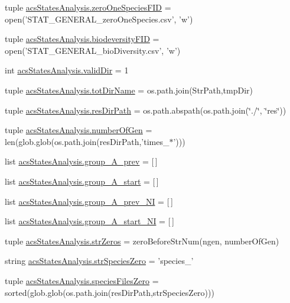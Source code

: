 \begin{DoxyCompactItemize}
\item 
tuple \hyperlink{a00098_a3dc90aca8a97c5995b013887c98d8ce9}{acs\-States\-Analysis.\-zero\-One\-Species\-F\-I\-D} = open('S\-T\-A\-T\-\_\-\-G\-E\-N\-E\-R\-A\-L\-\_\-zero\-One\-Species.\-csv', 'w')
\item 
tuple \hyperlink{a00098_a68c23cb79e89d9e14acf9ed09f46f0e4}{acs\-States\-Analysis.\-biodeversity\-F\-I\-D} = open('S\-T\-A\-T\-\_\-\-G\-E\-N\-E\-R\-A\-L\-\_\-bio\-Diversity.\-csv', 'w')
\item 
int \hyperlink{a00098_aebb18ab2b73e7e2705ee42c728c0a72b}{acs\-States\-Analysis.\-valid\-Dir} = 1
\item 
tuple \hyperlink{a00098_af4bd99f6cdaec32f48ed0074208b4f0c}{acs\-States\-Analysis.\-tot\-Dir\-Name} = os.\-path.\-join(Str\-Path,tmp\-Dir)
\item 
tuple \hyperlink{a00098_ab3da7da39258338965b6eef645a913ee}{acs\-States\-Analysis.\-res\-Dir\-Path} = os.\-path.\-abspath(os.\-path.\-join(\char`\"{}./\char`\"{}, \char`\"{}res\char`\"{}))
\item 
tuple \hyperlink{a00098_a54acb4eba0735e72c2a820383febd37f}{acs\-States\-Analysis.\-number\-Of\-Gen} = len(glob.\-glob(os.\-path.\-join(res\-Dir\-Path,'times\-\_\-$\ast$')))
\item 
list \hyperlink{a00098_a1dd2f2c85f697e454c99be1a157d6c17}{acs\-States\-Analysis.\-group\-\_\-\-A\-\_\-prev} = \mbox{[}$\,$\mbox{]}
\item 
list \hyperlink{a00098_a3898175300d001a17a60c23656d2812f}{acs\-States\-Analysis.\-group\-\_\-\-A\-\_\-start} = \mbox{[}$\,$\mbox{]}
\item 
list \hyperlink{a00098_a4d77133a6a303d9486944707f3310cf8}{acs\-States\-Analysis.\-group\-\_\-\-A\-\_\-prev\-\_\-\-N\-I} = \mbox{[}$\,$\mbox{]}
\item 
list \hyperlink{a00098_aedb746884c5ae6e301c8ad2d8307fe4d}{acs\-States\-Analysis.\-group\-\_\-\-A\-\_\-start\-\_\-\-N\-I} = \mbox{[}$\,$\mbox{]}
\item 
tuple \hyperlink{a00098_a292c23aa303304f24632662a5dfbfa23}{acs\-States\-Analysis.\-str\-Zeros} = zero\-Before\-Str\-Num(ngen, number\-Of\-Gen)
\item 
string \hyperlink{a00098_a52f7239b2be2cb978182547960b6c46e}{acs\-States\-Analysis.\-str\-Species\-Zero} = 'species\-\_\-'
\item 
tuple \hyperlink{a00098_a5584994da277e7798c904342dff18427}{acs\-States\-Analysis.\-species\-Files\-Zero} = sorted(glob.\-glob(os.\-path.\-join(res\-Dir\-Path,str\-Species\-Zero)))
\item 

\end{DoxyCompactItemize}
